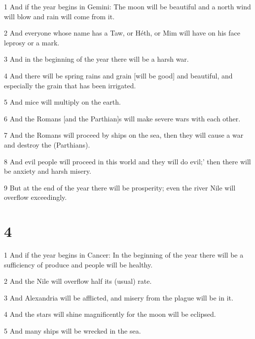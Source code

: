\par 1 And if the year begins in Gemini: The moon will be beautiful and a north wind will blow and rain will come from it. 

\par 2 And everyone whose name has a Taw, or Héth, or Mim will have on his face leprosy or a mark. 

\par 3 And in the beginning of the year there will be a harsh war. 

\par 4 And there will be spring rains and grain [will be good] and beautiful, and especially the grain that has been irrigated. 

\par 5 And mice will multiply on the earth. 

\par 6 And the Romans [and the Parthian]s will make severe wars with each other. 

\par 7 And the Romans will proceed by ships on the sea, then they will cause a war and destroy the (Parthians).

\par 8 And evil people will proceed in this world and they will do evil;' then there will be anxiety and harsh misery. 

\par 9 But at the end of the year there will be prosperity; even the river Nile will overflow exceedingly. 

\chapter{4}

\par 1 And if the year begins in Cancer: In the beginning of the year there will be a sufficiency of produce and people will be healthy. 

\par 2 And the Nile will overflow half its (usual) rate. 

\par 3 And Alexandria will be afflicted, and misery from the plague will be in it. 

\par 4 And the stars will shine magnificently for the moon will be eclipsed. 

\par 5 And many ships will be wrecked in the sea. 

